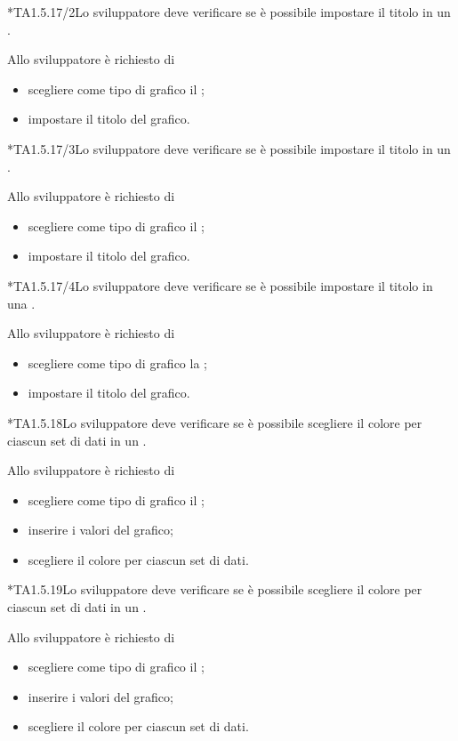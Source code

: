 	*{TA1.5.17/2}Lo sviluppatore deve verificare se è possibile impostare il titolo in un .

		Allo sviluppatore è richiesto di
		\begin{itemize}
			\item scegliere come tipo di grafico il ;
			\item impostare il titolo del grafico.
		\end{itemize}

	*{TA1.5.17/3}Lo sviluppatore deve verificare se è possibile impostare il titolo in un .

		Allo sviluppatore è richiesto di
		\begin{itemize}
			\item scegliere come tipo di grafico il ;
			\item impostare il titolo del grafico.
		\end{itemize}

	*{TA1.5.17/4}Lo sviluppatore deve verificare se è possibile impostare il titolo in una .

		Allo sviluppatore è richiesto di
		\begin{itemize}
			\item scegliere come tipo di grafico la ;
			\item impostare il titolo del grafico.
		\end{itemize}

	*{TA1.5.18}Lo sviluppatore deve verificare se è possibile scegliere il colore per ciascun set di dati in un .

		Allo sviluppatore è richiesto di
		\begin{itemize}
			\item scegliere come tipo di grafico il ;
			\item inserire i valori del grafico;
			\item scegliere il colore per ciascun set di dati.
		\end{itemize}

	*{TA1.5.19}Lo sviluppatore deve verificare se è possibile scegliere il colore per ciascun set di dati in un .

		Allo sviluppatore è richiesto di
		\begin{itemize}
			\item scegliere come tipo di grafico il ;
			\item inserire i valori del grafico;
			\item scegliere il colore per ciascun set di dati.
		\end{itemize}

